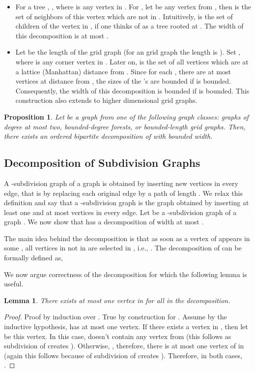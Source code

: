 \documentclass[11pt]{article}
\newtheorem{lemma}[theorem]{Lemma}
\newtheorem{proposition}[theorem]{Proposition}
\begin{document}
\begin{itemize}
\item {} For a tree , , where  is any vertex in . For , let  be any vertex from , then  is the set of neighbors of this vertex which are not in . Intuitively,  is the set of children of the vertex in , if one thinks of  as a tree rooted at . The width of this decomposition is at most .

\item {} Let   be the length of the grid graph  (for an  grid graph the length is ). Set , where  is any corner vertex in . Later on,  is the set of all vertices which are at a lattice (Manhattan) distance  from . Since for each , there are at most  vertices at distance  from , the sizes of the 's are bounded if  is bounded. Consequently, the width of this decomposition is bounded if  is bounded. This construction also extends to higher dimensional grid graphs.
\end{itemize}

\begin{proposition} \label{prop:1}
Let  be a graph from one of the following graph classes: graphs of degree at most two, bounded-degree forests, or bounded-length grid graphs. Then,  there exists an ordered bipartite decomposition of  with bounded width.
\end{proposition}

\subsection{Decomposition of Subdivision Graphs}\label{app6}
A -subdivision graph of a graph is obtained by inserting  new vertices in every edge, that is by replacing each original edge by a path of length . We relax this definition and say that a -subdivision graph is the graph obtained by inserting at least one and at most  vertices in every edge. Let  be a -subdivision graph of a graph . We now show that  has a decomposition of width at most .

The main idea behind the decomposition is that as soon as a vertex  of  appears in some , all vertices in  not in  are selected in , i.e., . The decomposition of  can be formally defined as, 

We now argue correctness of the decomposition for which the following lemma is useful.  
\begin{lemma} \label{sub}
There exists at most one vertex in  for all  in the decomposition.
\end{lemma}
\begin{proof}
Proof by induction over . True by construction for . Assume by the inductive hypothesis,  has at most one vertex. If there exists a vertex in , then let  be this vertex. In this case,  doesn't contain any vertex from  (this follows as subdivision of  creates ). Otherwise, , therefore, there is at most one vertex of  in  (again this follows because of subdivision of  creates ). Therefore, in both cases, .  
\end{proof}
\end{document}
